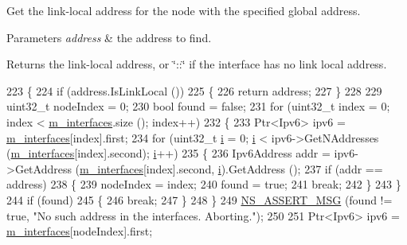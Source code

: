 Get the link-\/local address for the node with the specified global address. 


\begin{DoxyParams}{Parameters}
{\em address} & the address to find. \\
\hline
\end{DoxyParams}
\begin{DoxyReturn}{Returns}
the link-\/local address, or \char`\"{}\+::\char`\"{} if the interface has no link local address. 
\end{DoxyReturn}

\begin{DoxyCode}
223 \{
224   \textcolor{keywordflow}{if} (address.IsLinkLocal ())
225     \{
226       \textcolor{keywordflow}{return} address;
227     \}
228 
229   uint32\_t nodeIndex = 0;
230   \textcolor{keywordtype}{bool} found = \textcolor{keyword}{false};
231   \textcolor{keywordflow}{for} (uint32\_t index = 0; index < \hyperlink{classns3_1_1Ipv6InterfaceContainer_a559846ada263de96a3a5d0408824712d}{m\_interfaces}.size (); index++)
232     \{
233       Ptr<Ipv6> ipv6 = \hyperlink{classns3_1_1Ipv6InterfaceContainer_a559846ada263de96a3a5d0408824712d}{m\_interfaces}[index].first;
234       \textcolor{keywordflow}{for} (uint32\_t \hyperlink{bernuolliDistribution_8m_a6f6ccfcf58b31cb6412107d9d5281426}{i} = 0; \hyperlink{bernuolliDistribution_8m_a6f6ccfcf58b31cb6412107d9d5281426}{i} < ipv6->GetNAddresses (\hyperlink{classns3_1_1Ipv6InterfaceContainer_a559846ada263de96a3a5d0408824712d}{m\_interfaces}[index].second); 
      \hyperlink{bernuolliDistribution_8m_a6f6ccfcf58b31cb6412107d9d5281426}{i}++)
235         \{
236           Ipv6Address addr = ipv6->GetAddress (\hyperlink{classns3_1_1Ipv6InterfaceContainer_a559846ada263de96a3a5d0408824712d}{m\_interfaces}[index].second, 
      \hyperlink{bernuolliDistribution_8m_a6f6ccfcf58b31cb6412107d9d5281426}{i}).GetAddress ();
237           \textcolor{keywordflow}{if} (addr == address)
238             \{
239               nodeIndex = index;
240               found = \textcolor{keyword}{true};
241               \textcolor{keywordflow}{break};
242             \}
243         \}
244       \textcolor{keywordflow}{if} (found)
245         \{
246           \textcolor{keywordflow}{break};
247         \}
248     \}
249   \hyperlink{assert_8h_aff5ece9066c74e681e74999856f08539}{NS\_ASSERT\_MSG} (found != \textcolor{keyword}{true}, \textcolor{stringliteral}{"No such address in the interfaces. Aborting."});
250 
251   Ptr<Ipv6> ipv6 = \hyperlink{classns3_1_1Ipv6InterfaceContainer_a559846ada263de96a3a5d0408824712d}{m\_interfaces}[nodeIndex].first;

\end{DoxyCode}
